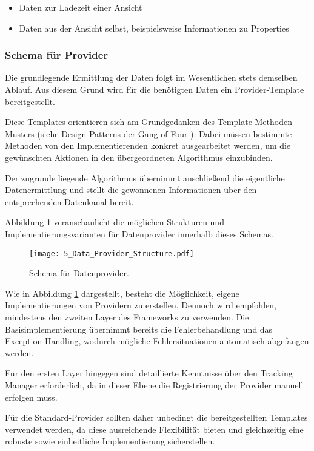 \begin{itemize}
    \item Daten zur Ladezeit einer Ansicht
    \item Daten aus der Ansicht selbst, beispielsweise Informationen zu Properties
\end{itemize}

\subsubsection{Schema für Provider}
Die grundlegende Ermittlung der Daten folgt im Wesentlichen stets demselben Ablauf. Aus diesem Grund wird für die benötigten Daten ein Provider-Template bereitgestellt.

Diese Templates orientieren sich am Grundgedanken des Template-Methoden-Musters (siehe Design Patterns der Gang of Four \cite{gamma1995design}). Dabei müssen bestimmte Methoden von den Implementierenden konkret ausgearbeitet werden, um die gewünschten Aktionen in den übergeordneten Algorithmus einzubinden.

Der zugrunde liegende Algorithmus übernimmt anschließend die eigentliche Datenermittlung und stellt die gewonnenen Informationen über den entsprechenden Datenkanal bereit.

Abbildung \ref{fig:structure_data_provider} veranschaulicht die möglichen Strukturen und Implementierungsvarianten für Datenprovider innerhalb dieses Schemas.

\begin{figure}[H]
\centering
\texttt{[image: 5\_Data\_Provider\_Structure.pdf]}
\caption{Schema für Datenprovider.}
\label{fig:structure_data_provider}
\end{figure}

Wie in Abbildung \ref{fig:structure_data_provider} dargestellt, besteht die Möglichkeit, eigene Implementierungen von Providern zu erstellen. Dennoch wird empfohlen, mindestens den zweiten Layer des Frameworks zu verwenden. Die Basisimplementierung übernimmt bereits die Fehlerbehandlung und das Exception Handling, wodurch mögliche Fehlersituationen automatisch abgefangen werden.

Für den ersten Layer hingegen sind detaillierte Kenntnisse über den Tracking Manager erforderlich, da in dieser Ebene die Registrierung der Provider manuell erfolgen muss.

Für die Standard-Provider sollten daher unbedingt die bereitgestellten Templates verwendet werden, da diese ausreichende Flexibilität bieten und gleichzeitig eine robuste sowie einheitliche Implementierung sicherstellen.

